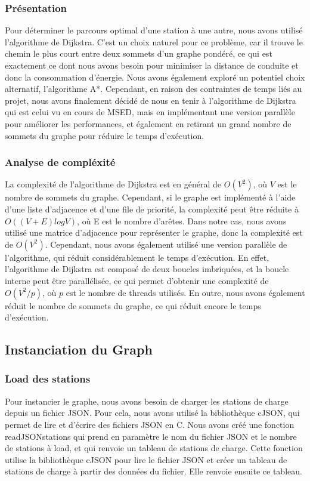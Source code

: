 \documentclass[french,a4paper]{article}
\begin{document}
    \subsubsection{Présentation}
    Pour déterminer le parcours optimal d'une station à une autre, nous avons utilisé l'algorithme de Dijkstra. C'est un choix naturel pour ce problème,
    car il trouve le chemin le plus court entre deux sommets d'un graphe pondéré, ce qui est exactement ce dont nous avons besoin pour minimiser
    la distance de conduite et donc la consommation d'énergie. Nous avons également exploré un potentiel choix alternatif, l'algorithme A*. Cependant, en
    raison des contraintes de temps liés au projet, nous avons finalement décidé de nous en tenir à l'algorithme de Dijkstra qui est celui vu en cours de
    MSED, mais en implémentant une version parallèle pour améliorer les performances, et également
    en retirant un grand nombre de sommets du graphe pour réduire le temps d'exécution.

    \subsubsection{Analyse de compléxité}

    La complexité de l'algorithme de Dijkstra est en général de $O(V^2)$, où $V$ est le nombre de sommets du graphe. Cependant, si le graphe est implémenté à l'aide d'une liste d'adjacence et d'une file de priorité, la complexité peut être réduite à $O((V+E) log V)$, où E est le nombre d'arêtes. Dans notre cas, nous avons utilisé une matrice d'adjacence pour représenter le graphe, donc la complexité est de $O(V^2)$. Cependant, nous avons également utilisé une version parallèle de l'algorithme, qui réduit considérablement le temps d'exécution. En effet, l'algorithme de Dijkstra est composé de deux boucles imbriquées, et la boucle interne peut être parallélisée, ce qui permet d'obtenir une complexité de $O(V^2/p)$, où $p$ est le nombre de threads utilisés. En outre, nous avons également réduit le nombre de sommets du graphe, ce qui réduit encore le temps d'exécution.

    \subsection{Instanciation du Graph}

    \subsubsection{Load des stations}
    Pour instancier le graphe, nous avons besoin de charger les stations de charge depuis un fichier JSON. Pour cela, nous avons utilisé la bibliothèque cJSON, qui permet de lire et d'écrire des fichiers JSON en C. Nous avons créé une fonction readJSONstations qui prend en paramètre le nom du fichier JSON et le nombre de stations à load, et qui renvoie un tableau de stations de charge. Cette fonction utilise la bibliothèque cJSON pour lire le fichier JSON et créer un tableau de stations de charge à partir des données du fichier. Elle renvoie ensuite ce tableau.
\end{document}
